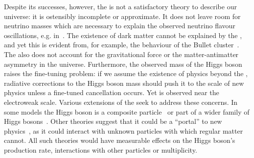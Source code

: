 Despite its successes, however, the \SM is not a satisfactory theory to describe our universe: it is ostensibly incomplete or approximate. It does not leave room for neutrino masses which are necessary to explain the observed neutrino flavour oscillations, e.g. in~\cite{DayaBay}. The existence of dark matter cannot be explained by the \SM, and yet this is evident from, for example, the behaviour of the Bullet cluster~\cite{1538-4357-648-2-L109}. The \SM also does not account for the gravitational force or the matter-antimatter asymmetry in the universe. Furthermore, the observed mass of the Higgs boson raises the fine-tuning problem: if we assume the existence of physics beyond the \SM, radiative corrections to the Higgs boson mass should push it to the scale of new physics unless a fine-tuned cancellation occurs. Yet \mH is observed near the electroweak scale. Various extensions of the \SM seek to address these concerns. In some models the Higgs boson is a composite particle~\cite{Agashe:2004rs} or part of a wider family of Higgs bosons~\cite{Craig:2013hca}. Other theories suggest that it could be a ``portal'' to new physics~\cite{Patt:2006fw}, as it could interact with unknown particles with which regular matter cannot. All such theories would have measurable effects on the Higgs boson's production rate, interactions with other particles or multiplicity. 

